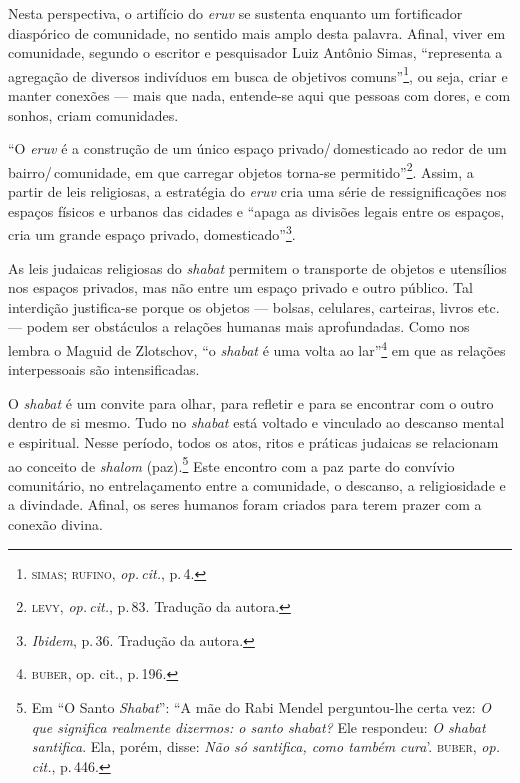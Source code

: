 Nesta perspectiva, o artifício do \emph{eruv} se sustenta enquanto um
fortificador diaspórico de comunidade, no sentido mais amplo desta
palavra. Afinal, viver em comunidade, segundo o escritor e pesquisador
Luiz Antônio Simas, ``representa a agregação de diversos
indivíduos em busca de objetivos comuns''\footnote{\textsc{simas}; \textsc{rufino}, \emph{op.\,cit.}, p.\,4.}, ou seja, criar e manter conexões --- mais que nada,
entende-se aqui que pessoas com dores, e com sonhos, criam comunidades.

\begin{center}\end{center}

\noindent{}``O \emph{eruv} é a construção de um único espaço privado/\,domesticado ao
redor de um bairro/\,comunidade, em que carregar objetos torna-se
permitido''\footnote{\textsc{levy}, \emph{op.\,cit.}, p.\,83. Tradução da autora.}. Assim, a
partir de leis religiosas, a estratégia do \emph{eruv} cria uma série de
ressignificações nos espaços físicos e urbanos das cidades
e ``apaga as divisões legais entre os espaços, cria um grande
espaço privado, domesticado''\footnote{\emph{Ibidem}, p.\,36. Tradução da autora.}.

As leis judaicas religiosas do \emph{shabat} permitem o transporte de
objetos e utensílios nos espaços privados, mas não entre um espaço
privado e outro público. Tal interdição justifica-se porque os objetos
--- bolsas, celulares, carteiras, livros etc. --- podem ser obstáculos a
relações humanas mais aprofundadas. Como nos lembra o Maguid de
Zlotschov, ``o \emph{shabat} é uma volta ao lar''\footnote{\textsc{buber}, op.
  cit., p.\,196.} em que as relações interpessoais são intensificadas.

O \emph{shabat} é um convite para olhar, para refletir e para se
encontrar com o outro dentro de si mesmo. Tudo no \emph{shabat} está
voltado e vinculado ao descanso mental e espiritual. Nesse período,
todos os atos, ritos e práticas judaicas se relacionam ao conceito de
\emph{shalom} (paz).\footnote{Em ``O Santo \emph{Shabat}'': ``A
  mãe do Rabi Mendel perguntou-lhe certa vez: \emph{O que significa realmente
  dizermos: o santo \emph{shabat}?} Ele respondeu: \emph{O \emph{shabat} santifica}. Ela,
  porém, disse: \emph{Não só santifica, como também cura}'. \textsc{buber}, \emph{op.\,cit.}, p.\,446.} Este encontro com a paz parte do
convívio comunitário, no entrelaçamento entre a comunidade, o descanso,
a religiosidade e a divindade. Afinal, os seres humanos foram criados
para terem prazer com a conexão divina.

